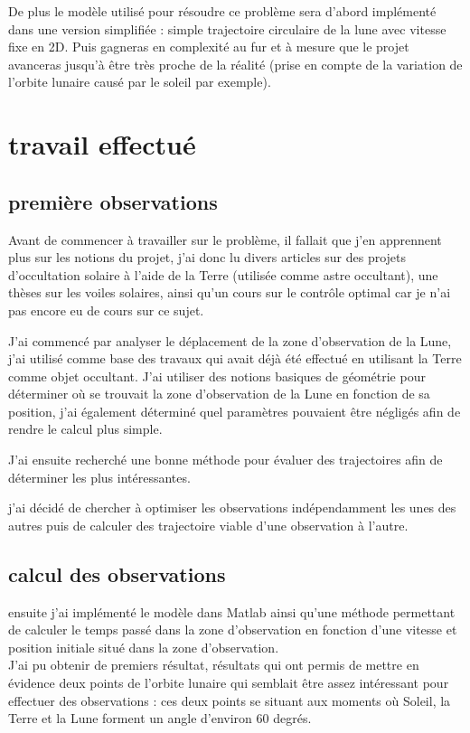 \documentclass{article} %
\begin{document}
		De plus le modèle utilisé pour résoudre ce problème sera d'abord implémenté dans une version simplifiée : simple trajectoire circulaire de la lune avec vitesse fixe en 2D. Puis gagneras en complexité au fur et à mesure que le projet avanceras jusqu'à être très proche de la réalité (prise en compte de la variation de l'orbite lunaire causé par le soleil par exemple).
		
		\newpage
		\section{travail effectué}
		
		\subsection{première observations}
		Avant de commencer à travailler sur le problème, il fallait que j'en apprennent plus sur les notions du projet, j'ai donc lu divers articles sur des projets d'occultation solaire à l'aide de la Terre (utilisée comme astre occultant), une thèses sur les voiles solaires, ainsi qu'un cours sur le contrôle optimal car je n'ai pas encore eu de cours sur ce sujet.
		
		J'ai commencé par analyser le déplacement de la zone d'observation de la Lune, j'ai utilisé comme base des travaux qui avait déjà été effectué en utilisant la Terre comme objet occultant. J'ai utiliser des notions basiques de géométrie pour déterminer où se trouvait la zone d'observation de la Lune en fonction de sa position, j'ai également déterminé quel paramètres pouvaient être négligés afin de rendre le calcul plus simple.
		
		J'ai ensuite recherché une bonne méthode pour évaluer des trajectoires afin de déterminer les plus intéressantes.
		
		j'ai décidé de chercher à optimiser les observations indépendamment les unes des autres puis de calculer des trajectoire viable d'une observation à l'autre.
		
		\subsection{calcul des observations}
		ensuite j'ai implémenté le modèle dans Matlab ainsi qu'une méthode permettant de calculer le temps passé dans la zone d'observation en fonction d'une vitesse et position initiale situé dans la zone d'observation.\\
		
		J'ai pu obtenir de premiers résultat, résultats qui ont permis de mettre en évidence deux points de l'orbite lunaire qui semblait être assez intéressant pour effectuer des observations : ces deux points se situant aux moments où Soleil, la Terre et la Lune forment un angle d'environ 60 degrés.
		
\end{document}

